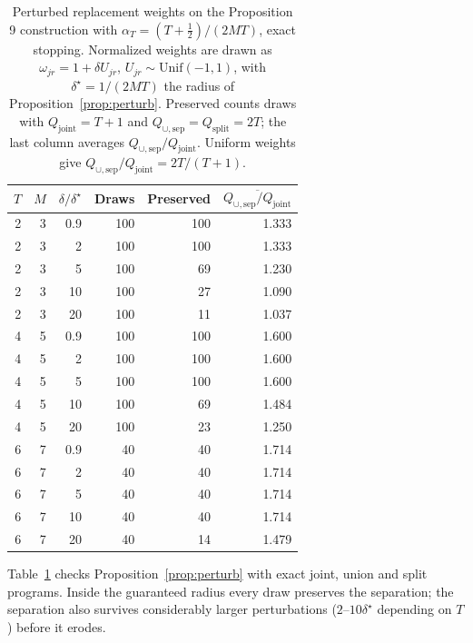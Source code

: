 \documentclass[11pt]{article}
\newcommand{\Qj}{Q_{\mathrm{joint}}}
\newcommand{\Qu}{Q_{\cup,\mathrm{sep}}}
\newcommand{\Qs}{Q_{\mathrm{split}}}
\begin{document}
\begin{table}[t]
\centering\small
\begin{tabular}{@{}rrrrrr@{}}
\toprule
$T$ & $M$ & $\delta/\delta^\star$ & Draws & Preserved & $\overline{\Qu/\Qj}$\\
\midrule
2 & 3 & 0.9 & 100 & 100 & 1.333\\
2 & 3 & 2 & 100 & 100 & 1.333\\
2 & 3 & 5 & 100 & 69 & 1.230\\
2 & 3 & 10 & 100 & 27 & 1.090\\
2 & 3 & 20 & 100 & 11 & 1.037\\
4 & 5 & 0.9 & 100 & 100 & 1.600\\
4 & 5 & 2 & 100 & 100 & 1.600\\
4 & 5 & 5 & 100 & 100 & 1.600\\
4 & 5 & 10 & 100 & 69 & 1.484\\
4 & 5 & 20 & 100 & 23 & 1.250\\
6 & 7 & 0.9 & 40 & 40 & 1.714\\
6 & 7 & 2 & 40 & 40 & 1.714\\
6 & 7 & 5 & 40 & 40 & 1.714\\
6 & 7 & 10 & 40 & 40 & 1.714\\
6 & 7 & 20 & 40 & 14 & 1.479\\
\bottomrule
\end{tabular}
\caption{Perturbed replacement weights on the Proposition 9 construction with $\alpha_T=(T+\frac12)/(2MT)$, exact stopping. Normalized weights are drawn as $\omega_{jr}=1+\delta U_{jr}$, $U_{jr}\sim\mathrm{Unif}(-1,1)$, with $\delta^\star=1/(2MT)$ the radius of Proposition~\ref{prop:perturb}. Preserved counts draws with $\Qj=T+1$ and $\Qu=\Qs=2T$; the last column averages $\Qu/\Qj$. Uniform weights give $\Qu/\Qj=2T/(T+1)$.}
\label{tab:perturb}
\end{table}

Table~\ref{tab:perturb} checks Proposition~\ref{prop:perturb} with exact joint, union and split programs. Inside the guaranteed radius every draw preserves the separation; the separation also survives considerably larger perturbations ($2$--$10\delta^\star$ depending on $T$) before it erodes.
\end{document}
